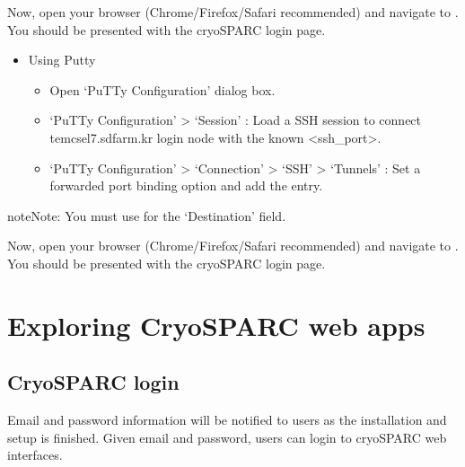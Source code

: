 \documentclass[a4paper,11pt,english]{sphinxmanual}
\begin{document}

\sphinxAtStartPar
Now, open your browser (Chrome/Firefox/Safari recommended) and navigate to . You should be presented with the cryoSPARC login page.
\begin{itemize}
\item {} 
\sphinxAtStartPar
Using Putty
\begin{itemize}
\item {} 
\sphinxAtStartPar
Open ‘PuTTy Configuration’ dialog box.

\item {} 
\sphinxAtStartPar
‘PuTTy Configuration’ \sphinxhyphen{}> ‘Session’ : Load a SSH session to connect tem\sphinxhyphen{}cs\sphinxhyphen{}el7.sdfarm.kr login node with the known <ssh\_port>.

\item {} 
\sphinxAtStartPar
‘PuTTy Configuration’ \sphinxhyphen{}> ‘Connection’ \sphinxhyphen{}> ‘SSH’ \sphinxhyphen{}> ‘Tunnels’ : Set a forwarded port binding option and add the entry.

\end{itemize}

\end{itemize}

\begin{sphinxadmonition}{note}{Note:}
\sphinxAtStartPar
You must use  for the ‘Destination’ field.
\end{sphinxadmonition}


\sphinxAtStartPar
Now, open your browser (Chrome/Firefox/Safari recommended) and navigate to . You should be presented with the cryoSPARC login page.


\section{Exploring CryoSPARC web apps}
\label{\detokenize{cryoSPARC:exploring-cryosparc-web-apps}}

\subsection{CryoSPARC login}
\label{\detokenize{cryoSPARC:cryosparc-login}}
\sphinxAtStartPar
E\sphinxhyphen{}mail and password information will be notified to users as the installation and setup is finished.
Given e\sphinxhyphen{}mail and password, users can login to cryoSPARC web interfaces.
\end{document}
